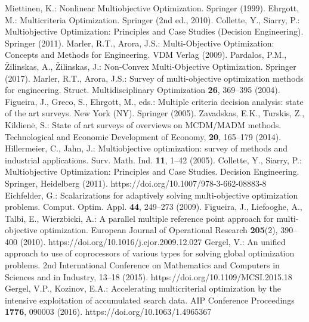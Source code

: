 \documentclass[runningheads]{llncs}
\begin{document}
%
%
%
\begin{thebibliography}{1}
\providecommand{\url}[1]{\texttt{#1}}
\providecommand{\urlprefix}{URL }
\providecommand{\doi}[1]{https://doi.org/#1}

 Miettinen, K.: Nonlinear Multiobjective Optimization. Springer (1999).
 Ehrgott, M.: Multicriteria Optimization. Springer (2nd ed., 2010).
 Collette, Y., Siarry, P.:  Multiobjective Optimization: Principles and Case Studies (Decision Engineering). Springer (2011).
 Marler, R.T., Arora, J.S.: Multi-Objective Optimization: Concepts and Methods for Engineering. VDM Verlag (2009).
 Pardalos, P.M., {\v Z}ilinskas, A., {\v Z}ilinskas, J.: Non-Convex Multi-Objective Optimization. Springer (2017).
 Marler, R.T., Arora, J.S.: Survey of multi-objective optimization methods for engineering. Struct. Multidisciplinary Optimization \textbf{26}, 369--395 (2004).
  Figueira, J., Greco, S., Ehrgott, M., eds.: Multiple criteria decision analysis: state of the art surveys. New York (NY). Springer (2005).
 Zavadskas, E.K., Turskis, Z., Kildien{\. e}, S.: State of art surveys of overviews on MCDM/MADM methods. Technological and Economic Development of Economy, \textbf{20}, 165--179 (2014).
 Hillermeier, C., Jahn, J.: Multiobjective optimization: survey of methods and industrial applications. Surv. Math. Ind. \textbf{11}, 1--42 (2005).
 Collette, Y., Siarry, P.: Multiobjective Optimization: Principles and Case Studies. Decision Engineering. Springer, Heidelberg (2011). \doi{10.1007/978-3-662-08883-8}
 Eichfelder, G.: Scalarizations for adaptively solving multi-objective optimization problems. Comput. Optim. Appl. \textbf{44}, 249--273 (2009).
 Figueira, J., Liefooghe, A., Talbi, E., Wierzbicki, A.: A parallel multiple reference point approach for multi-objective optimization. European Journal of Operational Research \textbf{205}(2), 390--400 (2010). \doi{10.1016/j.ejor.2009.12.027}
 Gergel, V.: An unified approach to use of coprocessors of various types for solving global optimization problems. 2nd International Conference on Mathematics and Computers in Sciences and in Industry, 13--18 (2015). \doi{10.1109/MCSI.2015.18}
 Gergel, V.P., Kozinov, E.A.: Accelerating multicriterial optimization by the intensive exploitation of accumulated search data. AIP Conference Proceedings \textbf{1776}, 090003 (2016). \doi{10.1063/1.4965367}

\end{thebibliography}
\end{document}

